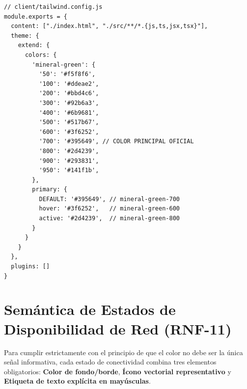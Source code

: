 \documentclass[12pt,a4paper]{report}
\begin{document}
\begin{lstlisting}
// client/tailwind.config.js
module.exports = {
  content: ["./index.html", "./src/**/*.{js,ts,jsx,tsx}"],
  theme: {
    extend: {
      colors: {
        'mineral-green': {
          '50': '#f5f8f6',
          '100': '#ddeae2',
          '200': '#bbd4c6',
          '300': '#92b6a3',
          '400': '#6b9681',
          '500': '#517b67',
          '600': '#3f6252',
          '700': '#395649', // COLOR PRINCIPAL OFICIAL
          '800': '#2d4239',
          '900': '#293831',
          '950': '#141f1b',
        },
        primary: {
          DEFAULT: '#395649', // mineral-green-700
          hover: '#3f6252',   // mineral-green-600
          active: '#2d4239',  // mineral-green-800
        }
      }
    }
  },
  plugins: []
}
\end{lstlisting}

\section{Semántica de Estados de Disponibilidad de Red (RNF-11)}
Para cumplir estrictamente con el principio de que el color no debe ser la única señal informativa, cada estado de conectividad combina tres elementos obligatorios: \textbf{Color de fondo/borde}, \textbf{Ícono vectorial representativo} y \textbf{Etiqueta de texto explícita en mayúsculas}.
\end{document}
